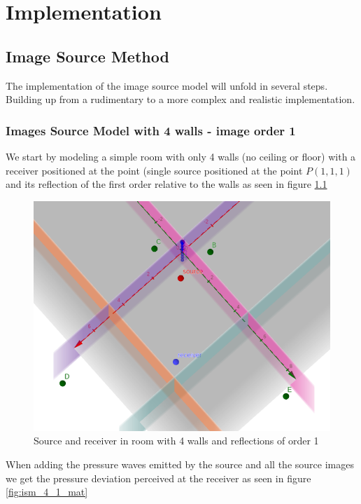 \chapter{Implementation}
\label{chap:implementation}
\section{Image Source Method}
The implementation of the image source model will unfold in several steps. Building up from a rudimentary to a more complex and realistic implementation.
\subsection{Images Source Model with 4 walls - image order 1}
We start by modeling a simple room with only 4 walls (no ceiling or floor) with a receiver positioned at the point (single source positioned at the point $P(1,1,1)$ and its reflection of the first order relative to the walls as seen in figure \ref{fig:ism_4_1_geo}\\
\begin{figure}
    \centerline{\includegraphics[width=1.3\textwidth,keepaspectratio]{LaTeX/images/geometrie/ism_4_walls_order_1.png}}
    \caption{Source and receiver in room with 4 walls and reflections of order 1}
    \label{fig:ism_4_1_geo}
\end{figure}
When adding the pressure waves emitted by the source and all the source images we get the pressure deviation perceived at the receiver as seen in figure \ref{fig:ism_4_1_mat}
